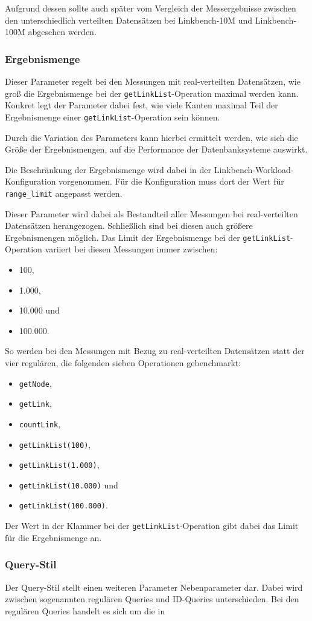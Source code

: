 Aufgrund dessen sollte auch später vom Vergleich der Messergebnisse zwischen den unterschiedlich verteilten Datensätzen bei Linkbench-10M und Linkbench-100M abgesehen werden.

\subsubsection{Ergebnismenge}
Dieser Parameter regelt bei den Messungen mit real-verteilten Datensätzen, wie groß die Ergebnismenge bei der \texttt{getLinkList}-Operation maximal werden kann. Konkret legt der Parameter dabei fest, wie viele Kanten maximal Teil der Ergebnismenge einer \texttt{getLinkList}-Operation sein können.

Durch die Variation des Parameters kann hierbei ermittelt werden, wie sich die Größe der Ergebnismengen, auf die Performance der Datenbanksysteme auswirkt. 

Die Beschränkung der Ergebnismenge wird dabei in der Linkbench-Workload-Konfiguration vorgenommen. Für die Konfiguration muss dort der Wert für \texttt{range\_limit} angepasst werden. 

Dieser Parameter wird dabei als Bestandteil aller Messungen bei real-verteilten Datensätzen herangezogen. Schließlich sind bei diesen auch größere Ergebnismengen möglich. Das Limit der Ergebnismenge bei der \texttt{getLinkList}-Operation variiert bei diesen Messungen immer zwischen: 
\begin{itemize}
    \item 100,
    \item 1.000,
    \item 10.000 und
    \item 100.000.
\end{itemize}

So werden bei den Messungen mit Bezug zu real-verteilten Datensätzen statt der vier regulären, die folgenden sieben Operationen gebenchmarkt:
\begin{itemize}
    \item \texttt{getNode},
    \item \texttt{getLink},
    \item \texttt{countLink},
    \item \texttt{getLinkList(100)},
    \item \texttt{getLinkList(1.000)},
    \item \texttt{getLinkList(10.000)} und
    \item \texttt{getLinkList(100.000)}.
\end{itemize}
Der Wert in der Klammer bei der \texttt{getLinkList}-Operation gibt dabei das Limit für die Ergebnismenge an. 

\subsubsection{Query-Stil}
Der Query-Stil stellt einen weiteren Parameter Nebenparameter dar. Dabei wird zwischen sogenannten regulären Queries und ID-Queries unterschieden. Bei den regulären Queries handelt es sich um die in 